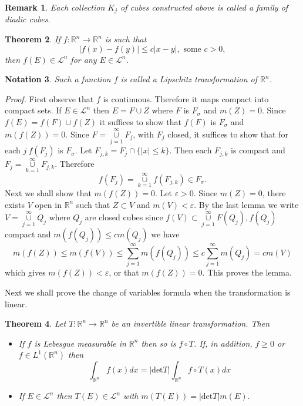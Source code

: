 \documentclass[12pt]{report}
\newtheorem{theorem}{Theorem}[section]
\newtheorem{no}[theorem]{Notation}
\newtheorem{re}[theorem]{Remark}
\begin{document}
\begin{re}  Each collection $K_j$ of cubes constructed above is
called a family of diadic cubes.
\end{re}

\begin{theorem}  If $f: \mathbb{R}^n \longrightarrow
\mathbb{R}^n$ is such that
\[
|f(x) - f(y) | \le c |x-y|, \mbox{ some } c > 0,
\]
then $f(E) \in \mathcal{L}^n$ for any $E \in \mathcal{L}^n$.
\end{theorem}

\begin{no}  Such a function $f$ is called a Lipschitz transformation of
$\mathbb{R}^n$.
\end{no}

\vspace{.25cm}
\noindent
{\em Proof.}  First observe that $f$ is continuous.  Therefore it maps
compact into compact sets.  If $E \in \mathcal{L}^n$ then $E = F \cup Z$
where $F $ is $F_\sigma$ and $m(Z) = 0$.  Since $f(E) = f(F) \cup f (Z)$ it
suffices to show that $f(F)$ is $F_\sigma$ and $m(f(Z)) = 0$.  Since $F =
\overset{\infty}{\underset{j=1}{\cup}} F_j$, with $F_j$ closed, it suffices
to show that for each $j\ f(F_j)$ is $F_\sigma$.  Let $F_{j, k} = F_j
\cap \{|x|
\le k\}$.  Then each $F_{j, k}$ is compact and $F_j =
\overset{\infty}{\underset{k=1}{\cup}} F_{j, k}$.  Therefore
\[
f(F_j) = \overset{\infty}{\underset{k=1}{\cup}} f(F_{j,k}) \in F_\sigma.
\]
Next we shall show that $m(f(Z)) = 0$.  Let $\varepsilon > 0 $.  Since $m(Z)
= 0$, there exists $V$ open in $\mathbb{R}^n$ such that $Z \subset V$ and 
$m(V) < \varepsilon$.  By the last lemma we  write $V =
\overset{\infty}{\underset{j=1}{\cup}} Q_j $ where $Q_j$ are closed cubes
since $f(V) \subset \overset{\infty}{\underset{j=1}{\cup}} F(Q_j), 
f(Q_j)$ compact and $m(f(Q_j)) \le cm(Q_j)$ we have
\[
m(f(Z)) \le m(f(V)) \le \sum^\infty_{j=1} m(f(Q_j)) \le c
\sum^\infty_{j=1} m(Q_j) = cm(V)
\]
which gives $m(f(Z)) < \varepsilon$, or that  $m(f(Z)) = 0$.  This proves
the lemma.

\vspace{.25cm}
\noindent
Next we shall prove the change of variables formula
when the transformation is linear.

\begin{theorem}  Let $T: \mathbb{R}^n
\longrightarrow \mathbb{R}^n$ be an invertible linear
transformation.  Then
\begin{itemize}
\item[(a)] If $f$ is Lebesgue measurable in
$\mathbb{R}^n$ then so is $f \circ T$.  If,  in addition, $f
\ge 0$ or $f \in L^1(\mathbb{R}^n)$ then
\[
\int_{\mathbb{R}^n} f(x) dx = |\mbox{det} T|
\int_{\mathbb{R}^n} f \circ T (x) dx
\]
\item[(b)]  If $E \in \mathcal{L}^n$ then $T(E) \in
\mathcal{L}^n$ with $m(T(E)) = |\mbox{det} T| m(E).$
\end{itemize}
\end{theorem}
\end{document}
